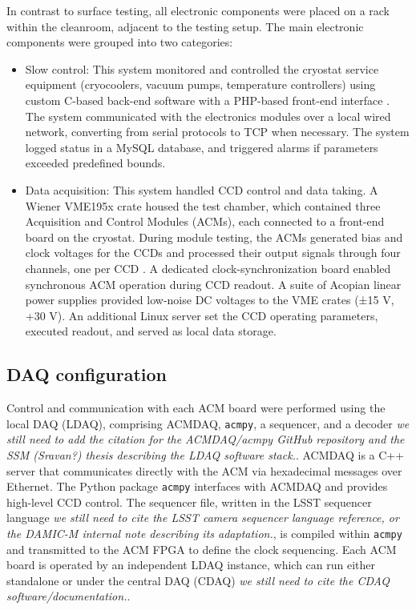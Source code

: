 \documentclass[11pt]{article}
\newcommand{\todonote}[1]{{\color{orange}\itshape #1}}
\begin{document}
In contrast to surface testing, all electronic components were placed on a rack within the cleanroom, adjacent to the testing setup. The main electronic components were grouped into two categories:

\begin{itemize}

\item Slow control: This system monitored and controlled the cryostat service equipment (cryocoolers, vacuum pumps, temperature controllers) using custom C-based back-end software with a PHP-based front-end interface \cite{DAMIC-M:2024ooa,slowcontrol}. The system communicated with the electronics modules over a local wired network, converting from serial protocols to TCP when necessary. The system logged status in a MySQL database, and triggered alarms if parameters exceeded predefined bounds. 

\item Data acquisition: This system handled CCD control and data taking. A Wiener VME195x crate housed the test chamber, which contained three Acquisition and Control Modules (ACMs), each connected to a front-end board on the cryostat. During module testing, the ACMs generated bias and clock voltages for the CCDs and processed their output signals through four channels, one per CCD \cite{Gaior:2023wfr}. A dedicated clock-synchronization board enabled synchronous ACM operation during CCD readout. A suite of Acopian linear power supplies provided low-noise DC voltages to the VME crates (±15 V, +30 V). An additional Linux server set the CCD operating parameters, executed readout, and served as local data storage.

\end{itemize}


\subsection{DAQ configuration}

Control and communication with each ACM board were performed using the local DAQ (LDAQ), comprising ACMDAQ, \texttt{acmpy}, a sequencer, and a decoder \todonote{we still need to add the citation for the ACMDAQ/acmpy GitHub repository and the SSM (Sravan?) thesis describing the LDAQ software stack.}. ACMDAQ is a C++ server that communicates directly with the ACM via hexadecimal messages over Ethernet. The Python package \texttt{acmpy} interfaces with ACMDAQ and provides high-level CCD control. The sequencer file, written in the LSST sequencer language \todonote{we still need to cite the LSST camera sequencer language reference, or the DAMIC-M internal note describing its adaptation.}, is compiled within \texttt{acmpy} and transmitted to the ACM FPGA to define the clock sequencing. Each ACM board is operated by an independent LDAQ instance, which can run either standalone or under the central DAQ (CDAQ) \todonote{we still need to cite the CDAQ software/documentation.}.
\end{document}
